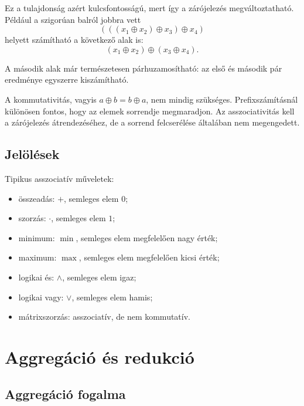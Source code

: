Ez a tulajdonság azért kulcsfontosságú, mert így a zárójelezés megváltoztatható. Például a szigorúan balról jobbra vett
\[
  (((x_1\oplus x_2)\oplus x_3)\oplus x_4)
\]
helyett számítható a következő alak is:
\[
  (x_1\oplus x_2)\oplus(x_3\oplus x_4).
\]

A második alak már természetesen párhuzamosítható: az első és második pár eredménye egyszerre kiszámítható.

\begin{warningbox}
A kommutativitás, vagyis $a\oplus b=b\oplus a$, nem mindig szükséges. Prefixszámításnál különösen fontos, hogy az elemek sorrendje megmaradjon. Az asszociativitás kell a zárójelezés átrendezéséhez, de a sorrend felcserélése általában nem megengedett.
\end{warningbox}

\subsection{Jelölések}

\begin{center}

\end{center}

Tipikus asszociatív műveletek:

\begin{itemize}
  \item összeadás: $+$, semleges elem $0$;
  \item szorzás: $\cdot$, semleges elem $1$;
  \item minimum: $\min$, semleges elem megfelelően nagy érték;
  \item maximum: $\max$, semleges elem megfelelően kicsi érték;
  \item logikai és: $\land$, semleges elem igaz;
  \item logikai vagy: $\lor$, semleges elem hamis;
  \item mátrixszorzás: asszociatív, de nem kommutatív.
\end{itemize}

\section{Aggregáció és redukció}

\subsection{Aggregáció fogalma}

